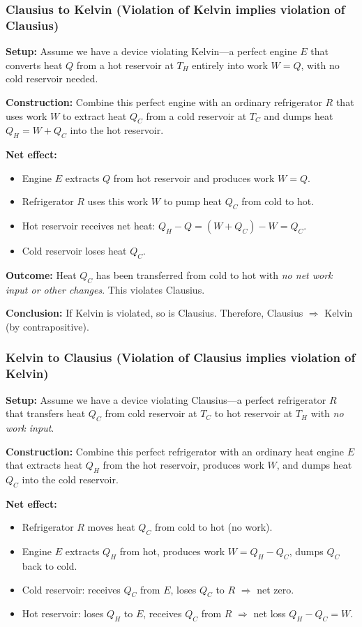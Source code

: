 \documentclass[9pt,twocoloumn]{article}
\begin{document}
\subsubsection{Clausius to Kelvin (Violation of Kelvin implies violation of Clausius)}

\textbf{Setup:} Assume we have a device violating Kelvin—a perfect engine $E$ that converts heat $Q$ from a hot reservoir at $T_H$ entirely into work $W = Q$, with no cold reservoir needed.

\textbf{Construction:} Combine this perfect engine with an ordinary refrigerator $R$ that uses work $W$ to extract heat $Q_C$ from a cold reservoir at $T_C$ and dumps heat $Q_H = W + Q_C$ into the hot reservoir.

\textbf{Net effect:}
\begin{itemize}
    \item Engine $E$ extracts $Q$ from hot reservoir and produces work $W = Q$.
    \item Refrigerator $R$ uses this work $W$ to pump heat $Q_C$ from cold to hot.
    \item Hot reservoir receives net heat: $Q_H - Q = (W + Q_C) - W = Q_C$.
    \item Cold reservoir loses heat $Q_C$.
\end{itemize}

\textbf{Outcome:} Heat $Q_C$ has been transferred from cold to hot with \emph{no net work input or other changes}. This violates Clausius.

\textbf{Conclusion:} If Kelvin is violated, so is Clausius. Therefore, Clausius $\Rightarrow$ Kelvin (by contrapositive).

\subsubsection{Kelvin to Clausius (Violation of Clausius implies violation of Kelvin)}

\textbf{Setup:} Assume we have a device violating Clausius—a perfect refrigerator $R$ that transfers heat $Q_C$ from cold reservoir at $T_C$ to hot reservoir at $T_H$ with \emph{no work input}.

\textbf{Construction:} Combine this perfect refrigerator with an ordinary heat engine $E$ that extracts heat $Q_H$ from the hot reservoir, produces work $W$, and dumps heat $Q_C$ into the cold reservoir.

\textbf{Net effect:}
\begin{itemize}
    \item Refrigerator $R$ moves heat $Q_C$ from cold to hot (no work).
    \item Engine $E$ extracts $Q_H$ from hot, produces work $W = Q_H - Q_C$, dumps $Q_C$ back to cold.
    \item Cold reservoir: receives $Q_C$ from $E$, loses $Q_C$ to $R$ $\Rightarrow$ net zero.
    \item Hot reservoir: loses $Q_H$ to $E$, receives $Q_C$ from $R$ $\Rightarrow$ net loss $Q_H - Q_C = W$.
\end{itemize}
\end{document}
